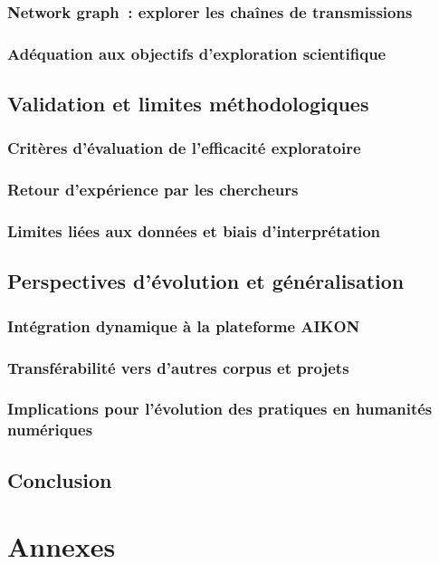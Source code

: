 \documentclass[a4paper,12pt,twoside]{book}
\newcommand{\clearemptydoublepage}{\newpage{\pagestyle{empty}\cleardoublepage}}
\newcommand\chapterNo[1]{
	\chapter*{#1}
	\markright{\MakeUppercase{#1}}
}
\begin{document}
	\section{Network graph~: explorer les chaînes de transmissions}

	\section{Adéquation aux objectifs d'exploration scientifique}

	\clearemptydoublepage

	\chapter{Validation et limites méthodologiques}
	\section{Critères d'évaluation de l'efficacité exploratoire}

	\section{Retour d'expérience par les chercheurs}

	\section{Limites liées aux données et biais d'interprétation}

	\clearemptydoublepage

	\chapter{Perspectives d'évolution et généralisation}
	\section{Intégration dynamique à la plateforme AIKON}

	\section{Transférabilité vers d'autres corpus et projets}

	\section{Implications pour l'évolution des pratiques en humanités numériques}

	\clearemptydoublepage

	\chapterNo{Conclusion}

	\appendix
	\part*{Annexes}

	\clearemptydoublepage

	\backmatter
	\printacronyms[title=Liste des acronymes,toctitle=Acronymes]
	\printglossary
	\printbibliography
	\tableofcontents
\end{document}
